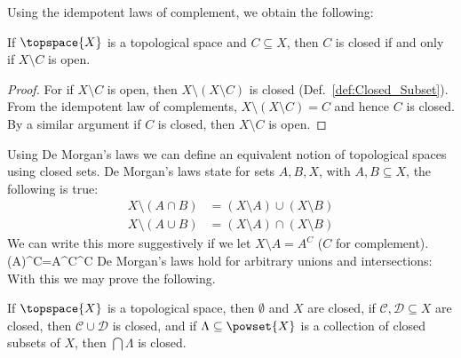         Using the idempotent laws of complement, we obtain the
        following:
        \begin{theorem}
            \label{thm:Closed_Iff_Comp_is_Open}%
            If $\topspace{X}$ is a topological space and
            $C\subseteq{X}$, then $C$ is closed if and only if
            $X\setminus{C}$ is open.
        \end{theorem}
        \begin{proof}
            For if $X\setminus{C}$ is open, then
            $X\setminus(X\setminus{C})$ is closed
            (Def.~\ref{def:Closed_Subset}). From the idempotent law of
            complements, $X\setminus(X\setminus{C})=C$ and hence $C$ is
            closed. By a similar argument if $C$ is closed, then
            $X\setminus{C}$ is open.
        \end{proof}
        Using De Morgan's laws we can define an equivalent notion of
        topological spaces using closed sets. De Morgan's laws state for
        sets $A,B,X$, with $A,B\subseteq{X}$, the following is true:%
        \begin{subequations}
            \begin{align}
                X\setminus(A\cap{B})
                    &=(X\setminus{A})\cup(X\setminus{B})\\
                X\setminus(A\cup{B})
                    &=(X\setminus{A})\cap(X\setminus{B})
            \end{align}
        \end{subequations}
        We can write this more suggestively if we let
        $X\setminus{A}=A^{C}$ ($C$ for complement).
        \vspace{-5ex}
                    {(A)^{C}=A^{C}^{C}}
        De Morgan's laws hold for arbitrary unions and intersections:
        With this we may prove the following.
        \begin{theorem}
            If $\topspace{X}$ is a topological space, then $\emptyset$
            and $X$ are closed, if $\mathcal{C},\mathcal{D}\subseteq{X}$
            are closed, then $\mathcal{C}\cup\mathcal{D}$ is closed, and
            if $\Lambda\subseteq\powset{X}$ is a collection of closed
            subsets of $X$, then $\bigcap\Lambda$ is closed.
        \end{theorem}
